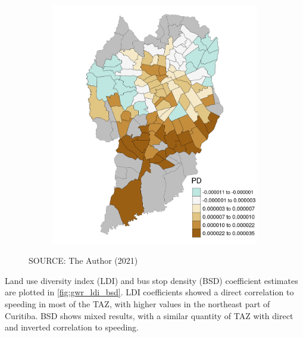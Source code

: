 \begin{figure}[!htbp]
\begin{subfigure}{0.5\textwidth}
        \includegraphics{fig/PD.png}
    \end{subfigure}    
    \label{fig:gwr_avi_pd}
    \par SOURCE: The Author (2021)
\end{figure}


Land use diversity index (LDI) and bus stop density (BSD) coefficient estimates are plotted in \autoref{fig:gwr_ldi_bsd}. LDI coefficients showed a direct correlation to speeding in most of the TAZ, with higher values in the northeast part of Curitiba. BSD shows mixed results, with a similar quantity of TAZ with direct and inverted correlation to speeding.  

